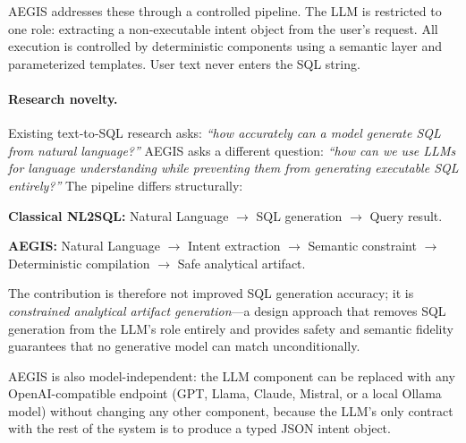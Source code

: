\documentclass[11pt]{article}
\begin{document}
AEGIS addresses these through a controlled pipeline. The LLM is restricted to one role: extracting a non‑executable intent object from the user's request. All execution is controlled by deterministic components using a semantic layer and parameterized templates. User text never enters the SQL string.

\paragraph{Research novelty.} Existing text‑to‑SQL research asks: \emph{``how accurately can a model generate SQL from natural language?''} AEGIS asks a different question: \emph{``how can we use LLMs for language understanding while preventing them from generating executable SQL entirely?''} The pipeline differs structurally:

\smallskip
\noindent\textbf{Classical NL2SQL:} Natural Language $\rightarrow$ SQL generation $\rightarrow$ Query result.

\noindent\textbf{AEGIS:} Natural Language $\rightarrow$ Intent extraction $\rightarrow$ Semantic constraint $\rightarrow$ Deterministic compilation $\rightarrow$ Safe analytical artifact.

\smallskip
\noindent The contribution is therefore not improved SQL generation accuracy; it is \emph{constrained analytical artifact generation}—a design approach that removes SQL generation from the LLM's role entirely and provides safety and semantic fidelity guarantees that no generative model can match unconditionally.

AEGIS is also model-independent: the LLM component can be replaced with any OpenAI-compatible endpoint (GPT, Llama, Claude, Mistral, or a local Ollama model) without changing any other component, because the LLM's only contract with the rest of the system is to produce a typed JSON intent object.
\end{document}

